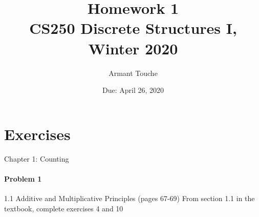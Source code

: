 \documentclass[11pt, a4paper]{article}
\title{\bf Homework 1\\[1ex]
\rm\normalsize CS250 Discrete Structures I, Winter 2020 }
\date{\normalsize Due: April 26, 2020}
\author{\normalsize Armant Touche}
\begin{document}
 
\vspace{0cm}\maketitle 
	\section{Exercises} Chapter 1: Counting\newline
	\paragraph{Problem 1} 1.1 Additive and Multiplicative Principles (pages 67-69)\newline
	From section 1.1 in the textbook, complete exercises 4 and 10
\end{document}
